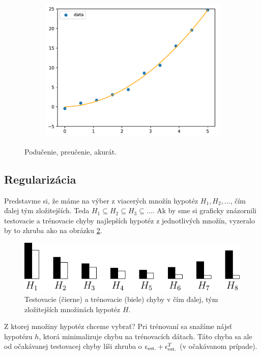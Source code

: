\begin{figure}
\begin{subfigure}[b]{0.3\textwidth}
    \includegraphics[width=\linewidth]{obrazky/fitting2.pdf}
  \end{subfigure}
  \caption{Podučenie, preučenie, akurát.}
  \label{img:fitting}
\end{figure}



\subsection{Regularizácia}

Predstavme si, že máme na výber z viacerých množín hypotéz $H_1, H_2, \ldots$,
čím ďalej tým zložitejších. Teda $H_1 \subseteq H_2 \subseteq H_3 \subseteq \ldots$.
Ak by sme si graficky znázornili testovacie a trénovacie chyby najlepších
hypotéz z jednotlivých množín, vyzeralo by to zhruba ako na obrázku
\ref{img:multimodels}.

\begin{figure}
  \centering
  \includegraphics[scale=1]{obrazky/multimodels.pdf}
  \caption{Testovacie (čierne) a trénovacie (biele) chyby v čím ďalej,
    tým zložitejších množinách hypotéz $H$.}
  \label{img:multimodels}
\end{figure}

Z ktorej množiny hypotéz chceme vybrať? Pri trénovaní sa snažíme nájsť
hypotézu $h$, ktorá minimalizuje chybu na trénovacích dátach. Táto
chyba sa ale od očakávanej testovacej chyby líši zhruba
o ${\epsilon_\text{est.}} + {\epsilon^T_\text{est.}}$ (v očakávanom prípade).

